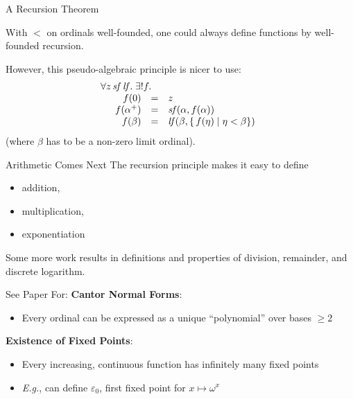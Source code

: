 \documentclass[xetex,14pt]{beamer}
\begin{document}
\begin{frame}{A Recursion Theorem}

With $<$ on ordinals well-founded, one could always define functions by well-founded recursion.

\bigskip
{}
However, this pseudo-algebraic principle is nicer to use:
\[
\begin{array}{l}
\forall z\,\mathit{sf}\,\mathit{lf}.\;\exists! f.\\
\quad\begin{array}[t]{rcl}
f(0) &=& z\\
f(\alpha^+) &=& \mathit{sf}(\alpha,f(\alpha))\\
f(\beta) &=& \mathit{lf}(\beta, \{\, f(\eta)\mid \eta < \beta\})
\end{array}
\end{array}
\]
(where $\beta$ has to be a non-zero limit ordinal).

\end{frame}

\begin{frame}{Arithmetic Comes Next}
The recursion principle makes it easy to define
\begin{itemize}
\item addition,
\item multiplication,
\item exponentiation
\end{itemize}

\bigskip
Some more work results in definitions and properties of division, remainder, and discrete logarithm.

\end{frame}

\begin{frame}{See Paper For:}
\textbf{Cantor Normal Forms}:
\begin{itemize}
\item Every ordinal can be expressed as a unique “polynomial” over bases $\geq 2$
\end{itemize}

\bigskip\bigskip{}
\textbf{Existence of Fixed Points}:
\begin{itemize}
\item Every increasing, continuous function has infinitely many fixed points
\item \emph{E.g.}, can define $\varepsilon_0$, first fixed point for $x \mapsto \omega^x$
\end{itemize}

\end{frame}
\end{document}
